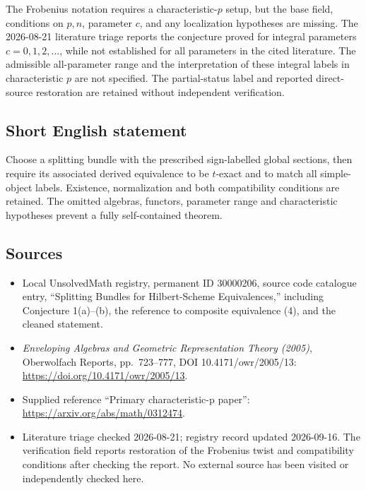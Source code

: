 \documentclass[11pt]{article}
\begin{document}
The Frobenius notation requires a characteristic-\(p\) setup, but the base field, conditions on \(p,n\), parameter \(c\), and any localization hypotheses are missing. The 2026-08-21 literature triage reports the conjecture proved for integral parameters \(c=0,1,2,\ldots\), while not established for all parameters in the cited literature. The admissible all-parameter range and the interpretation of these integral labels in characteristic \(p\) are not specified. The partial-status label and reported direct-source restoration are retained without independent verification.
\subsection{Short English statement}
Choose a splitting bundle with the prescribed sign-labelled global sections, then require its associated derived equivalence to be \(t\)-exact and to match all simple-object labels. Existence, normalization and both compatibility conditions are retained. The omitted algebras, functors, parameter range and characteristic hypotheses prevent a fully self-contained theorem.
\subsection{Sources}
\begin{itemize}
\item Local UnsolvedMath registry, permanent ID 30000206, source code catalogue entry, ``Splitting Bundles for Hilbert-Scheme Equivalences,'' including Conjecture 1(a)--(b), the reference to composite equivalence (4), and the cleaned statement.
\item \emph{Enveloping Algebras and Geometric Representation Theory (2005)}, Oberwolfach Reports, pp.\ 723--777, DOI 10.4171/owr/2005/13: \url{https://doi.org/10.4171/owr/2005/13}.
\item Supplied reference ``Primary characteristic-p paper'': \url{https://arxiv.org/abs/math/0312474}.
\item Literature triage checked 2026-08-21; registry record updated 2026-09-16. The verification field reports restoration of the Frobenius twist and compatibility conditions after checking the report. No external source has been visited or independently checked here.
\end{itemize}
\end{document}
